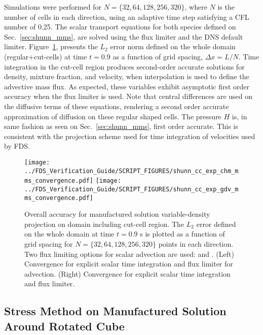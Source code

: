 \documentclass[11pt]{book}
\begin{document}
Simulations were performed for $N = \{32, 64, 128, 256, 320\}$, where $N$ is the number of cells in each direction, using an adaptive time step satisfying a CFL number of 0.25. The scalar transport equations for both species defined on Sec.~\ref{sec:shunn_mms}, are solved using the  flux limiter and the DNS default  limiter. Figure~\ref{fig:shunn_cc_accuracy_order}, presents the $L_2$ error norm defined on the whole domain (regular+cut-cells) at time $t = 0.9$ as a function of grid spacing, $\Delta x = L/N$. Time integration in the cut-cell region produces second-order accurate solutions for density, mixture fraction, and velocity, when  interpolation is used to define the advective mass flux. As expected, these variables exhibit asymptotic first order accuracy when the  flux limiter is used. Note that central differences are used on the diffusive terms of these equations, rendering a second order accurate approximation of diffusion on these regular shaped cells. The pressure $H$ is, in same fashion as seen on Sec.~\ref{sec:shunn_mms}, first order accurate. This is consistent with the projection scheme used for time integration of velocities used by FDS.


\begin{figure}[ht]
\centering
\texttt{[image: ../FDS\_Verification\_Guide/SCRIPT\_FIGURES/shunn\_cc\_exp\_chm\_mms\_convergence.pdf]}
\texttt{[image: ../FDS\_Verification\_Guide/SCRIPT\_FIGURES/shunn\_cc\_exp\_gdv\_mms\_convergence.pdf]}
\caption[The  accuracy order test case]{Overall accuracy for manufactured solution variable-density projection on domain including cut-cell region. The $L_2$ error defined on the whole domain at time $t = 0.9$ s is plotted as a function of grid spacing for $N=\{32,64,128,256,320\}$ points in each direction. Two flux limiting options for scalar advection are used:  and .  (Left) Convergence for explicit scalar time integration and  flux limiter for advection.  (Right) Convergence for explicit scalar time integration and  flux limiter. }\label{fig:shunn_cc_accuracy_order}
\end{figure}


\subsection{Stress Method on Manufactured Solution Around Rotated Cube}

\label{sec:rotcube_cc_mms}
\end{document}
